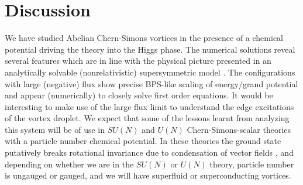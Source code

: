 \section{Discussion}
We have studied Abelian Chern-Simons vortices in the presence of a chemical potential driving the theory into the Higgs phase. The numerical solutions reveal several features which are in line with the physical picture presented in an analytically solvable (nonrelativistic) supersymmetric model \cite{Tong:2015xaa, Tong:2003vy}.  The configurations with large (negative) flux show precise BPS-like scaling of energy/grand potential and appear (numerically) to closely solve first order equations.
It would be interesting to make use of the large flux limit to understand the edge excitations of the vortex droplet. We expect that some of the lessons learnt from analyzing this system will be of use in $SU(N)$ and $U(N)$ Chern-Simons-scalar theories with a particle number chemical potential. In these theories the ground state putatively breaks rotational invariance due to condensation of vector fields \cite{Kumar:2018nkf}, and depending on whether we are in the $SU(N)$ or $U(N)$ theory, particle number is ungauged or gauged,  and we will have superfluid or superconducting vortices. 



